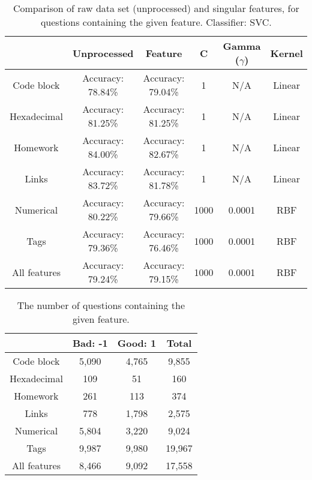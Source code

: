 \begin{table}[!h]%
	\centering
	\begin{tabular}{| c | c | c | c | c | c |}
		\hline
		~				& Unprocessed			& Feature						& C				& Gamma ($\gamma$)	& Kernel	\\ \hline
		Code block	 	& Accuracy: 78.84\%		& Accuracy: 79.04\%				& 1				& N/A				& Linear 	\\ \hline
		Hexadecimal		& Accuracy: 81.25\%		& Accuracy: 81.25\%				& 1				& N/A				& Linear	\\ \hline
		Homework 		& Accuracy: 84.00\%		& Accuracy: 82.67\%				& 1				& N/A				& Linear	\\ \hline
		Links			& Accuracy: 83.72\%		& Accuracy: 81.78\%				& 1				& N/A				& Linear	\\ \hline		
		Numerical		& Accuracy: 80.22\%		& Accuracy: 79.66\%				& 1000			& 0.0001			& RBF		\\ \hline
		Tags			& Accuracy: 79.36\%		& Accuracy: 76.46\%				& 1000			& 0.0001			& RBF		\\ \hline
		All features	& Accuracy: 79.24\%		& Accuracy: 79.15\%				& 1000 			& 0.0001			& RBF 		\\ \hline
	\end{tabular}
	\caption{Comparison of raw data set (unprocessed) and singular features, for questions containing the given feature. Classifier: SVC.}
	\label{tab:comparison_of_feature_occurences_only}
\end{table}
\begin{table}[!h]%
	\centering
	\begin{tabular}{| c | c | c | c |}
		\hline
		~ 					& Bad: -1			& Good: 1		& Total		\\ \hline
		Code block			& 5,090				& 4,765			& 9,855		\\ \hline
		Hexadecimal			& 109				& 51			& 160		\\ \hline
		Homework			& 261				& 113			& 374		\\ \hline
		Links				& 778				& 1,798			& 2,575		\\ \hline
		Numerical			& 5,804				& 3,220			& 9,024		\\ \hline
		Tags				& 9,987				& 9,980			& 19,967	\\ \hline
		All features		& 8,466				& 9,092			& 17,558	\\ \hline
	\end{tabular}
	\caption{The number of questions containing the given feature.}
	\label{tab:amount_of_singular_questions_processed}
\end{table}

